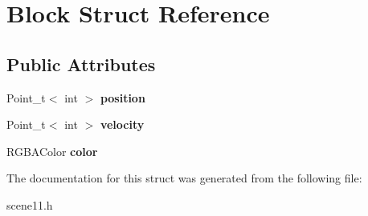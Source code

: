 \hypertarget{struct_block}{}\section{Block Struct Reference}
\label{struct_block}
\subsection*{Public Attributes}
\begin{DoxyCompactItemize}
\item 
\mbox{\label{struct_block_aaa6a03a44f493a642f5254f45de02785}} 
Point\+\_\+t$<$ int $>$ {\bfseries position}
\item 
\mbox{\label{struct_block_a97a75574281e1a2a57fb6fd3fad16194}} 
Point\+\_\+t$<$ int $>$ {\bfseries velocity}
\item 
\mbox{\label{struct_block_a3ae5237a292637ddf5b2aa44e70a2325}} 
R\+G\+B\+A\+Color {\bfseries color}
\end{DoxyCompactItemize}


The documentation for this struct was generated from the following file\+:\begin{DoxyCompactItemize}
\item 
scene11.\+h\end{DoxyCompactItemize}
